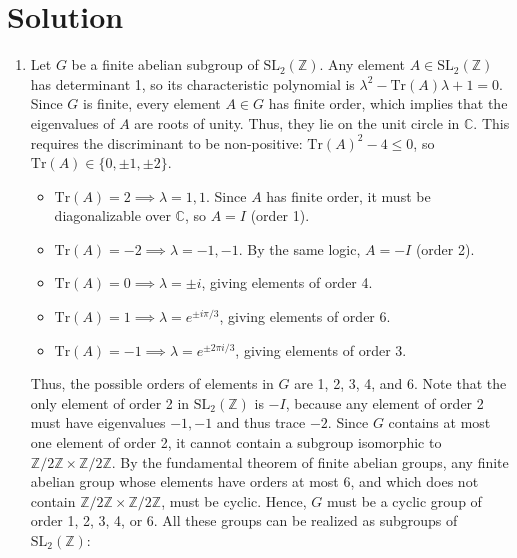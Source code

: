 \documentclass{article}
\begin{document}
\section*{Solution}
\begin{enumerate}[label=\fbox{\arabic*}]
  \item %
        Let $G$ be a finite abelian subgroup of $\mathrm{SL}_2(\mathbb{Z})$.
        Any element $A \in \mathrm{SL}_2(\mathbb{Z})$ has determinant 1, so its characteristic polynomial is $\lambda^2 - \mathrm{Tr}(A)\lambda + 1 = 0$. 
        Since $G$ is finite, every element $A \in G$ has finite order, which implies that the eigenvalues of $A$ are roots of unity. Thus, they lie on the unit circle in $\mathbb{C}$.
        This requires the discriminant to be non-positive: $\mathrm{Tr}(A)^2 - 4 \le 0$, so $\mathrm{Tr}(A) \in \{0, \pm 1, \pm 2\}$.
        \begin{itemize}
          \item $\mathrm{Tr}(A) = 2 \implies \lambda = 1, 1$. Since $A$ has finite order, it must be diagonalizable over $\mathbb{C}$, so $A = I$ (order 1).
          \item $\mathrm{Tr}(A) = -2 \implies \lambda = -1, -1$. By the same logic, $A = -I$ (order 2).
          \item $\mathrm{Tr}(A) = 0 \implies \lambda = \pm i$, giving elements of order 4.
          \item $\mathrm{Tr}(A) = 1 \implies \lambda = e^{\pm i\pi/3}$, giving elements of order 6.
          \item $\mathrm{Tr}(A) = -1 \implies \lambda = e^{\pm 2\pi i/3}$, giving elements of order 3.
        \end{itemize}
        Thus, the possible orders of elements in $G$ are 1, 2, 3, 4, and 6. 
        Note that the only element of order 2 in $\mathrm{SL}_2(\mathbb{Z})$ is $-I$, because any element of order 2 must have eigenvalues $-1, -1$ and thus trace $-2$.
        Since $G$ contains at most one element of order 2, it cannot contain a subgroup isomorphic to $\mathbb{Z}/2\mathbb{Z} \times \mathbb{Z}/2\mathbb{Z}$.
        By the fundamental theorem of finite abelian groups, any finite abelian group whose elements have orders at most 6, and which does not contain $\mathbb{Z}/2\mathbb{Z} \times \mathbb{Z}/2\mathbb{Z}$, must be cyclic.
        Hence, $G$ must be a cyclic group of order 1, 2, 3, 4, or 6. 
        All these groups can be realized as subgroups of $\mathrm{SL}_2(\mathbb{Z})$:
        \begin{itemize}

\end{itemize}
\end{enumerate}
\end{document}
